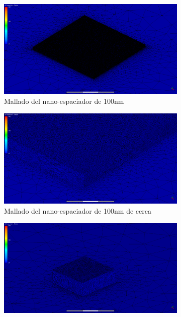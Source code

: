 \begin{enumerate}
\begin{figure}[h]
\begin{subfigure}[b]{0.3\textwidth}
			\includegraphics[width=1.00\textwidth]{figuras/Procedimiento_Simulaciones/Conduccion/mallado_100.png}
		\caption{Mallado del nano-espaciador de 100nm}
		\label{fig:mallado_100_metodos}
	\end{subfigure}
	\hfill
	\begin{subfigure}[b]{0.3\textwidth}
		\centering
			\includegraphics[width=1.00\textwidth]{figuras/Procedimiento_Simulaciones/Conduccion/mallado_100_cerca.png}
		\caption{Mallado del nano-espaciador de 100nm de cerca}
		\label{fig:mallado_100_cerca_metodos}
	\end{subfigure}
	\hfill
	\begin{subfigure}[b]{0.3\textwidth}
		\centering
			\includegraphics[width=1.00\textwidth]{figuras/Procedimiento_Simulaciones/Conduccion/mallado_1000.png}

\end{subfigure}
\end{figure}
\end{enumerate}
